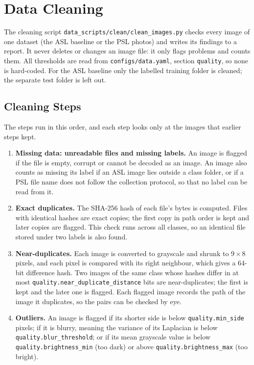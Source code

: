 \section{Data Cleaning}
\label{sec:data-cleaning}

The cleaning script \texttt{data\_scripts/clean/clean\_images.py} checks every image of one dataset (the ASL baseline or the PSL photos) and writes its findings to a report. It never deletes or changes an image file: it only flags problems and counts them. All thresholds are read from \texttt{configs/data.yaml}, section \texttt{quality}, so none is hard-coded. For the ASL baseline only the labelled training folder is cleaned; the separate test folder is left out.

\subsection{Cleaning Steps}

The steps run in this order, and each step looks only at the images that earlier steps kept.
\begin{enumerate}
  \item \textbf{Missing data: unreadable files and missing labels.} An image is flagged if the file is empty, corrupt or cannot be decoded as an image. An image also counts as missing its label if an ASL image lies outside a class folder, or if a PSL file name does not follow the collection protocol, so that no label can be read from it.
  \item \textbf{Exact duplicates.} The SHA-256 hash of each file's bytes is computed. Files with identical hashes are exact copies; the first copy in path order is kept and later copies are flagged. This check runs across all classes, so an identical file stored under two labels is also found.
  \item \textbf{Near-duplicates.} Each image is converted to grayscale and shrunk to $9 \times 8$ pixels, and each pixel is compared with its right neighbour, which gives a 64-bit difference hash. Two images of the same class whose hashes differ in at most \texttt{quality.near\_duplicate\_distance} bits are near-duplicates; the first is kept and the later one is flagged. Each flagged image records the path of the image it duplicates, so the pairs can be checked by eye.
  \item \textbf{Outliers.} An image is flagged if its shorter side is below \texttt{quality.min\_side} pixels; if it is blurry, meaning the variance of its Laplacian is below \texttt{quality.blur\_threshold}; or if its mean grayscale value is below \texttt{quality.brightness\_min} (too dark) or above \texttt{quality.brightness\_max} (too bright).
\end{enumerate}

